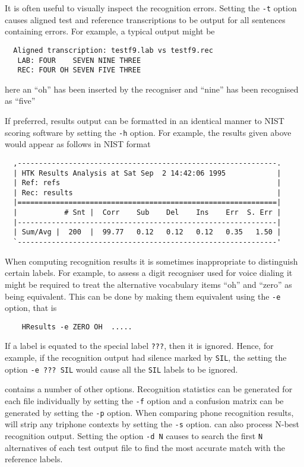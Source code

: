 It is often useful to visually inspect the 
recognition errors.  Setting the
\texttt{-t} option causes aligned test and reference transcriptions to
be output for all sentences containing errors.  For example, a typical
output might be
\begin{verbatim}
  Aligned transcription: testf9.lab vs testf9.rec
   LAB: FOUR    SEVEN NINE THREE
   REC: FOUR OH SEVEN FIVE THREE
\end{verbatim}
here an ``oh'' has been inserted by the recogniser and ``nine''
has been recognised as ``five''

If preferred, results output can be formatted in an identical
manner to NIST scoring software by setting the  {\tt -h} option.
For example, the results given above would appear as follows in
NIST format
\begin{verbatim}
  ,-------------------------------------------------------------.
  | HTK Results Analysis at Sat Sep  2 14:42:06 1995            |
  | Ref: refs                                                   |
  | Rec: results                                                |
  |=============================================================|
  |           # Snt |  Corr    Sub    Del    Ins    Err  S. Err |
  |-------------------------------------------------------------|
  | Sum/Avg |  200  |  99.77   0.12   0.12   0.12   0.35   1.50 |
  `-------------------------------------------------------------'
\end{verbatim}

When computing recognition results it is sometimes
inappropriate to distinguish certain labels.  For example, to assess
a digit recogniser used for voice dialing it might be required to
treat the alternative vocabulary items ``oh'' and ``zero'' as being
equivalent.  This can be done by making them equivalent using the
\texttt{-e} option, that is
\begin{verbatim}
    HResults -e ZERO OH  .....
\end{verbatim}
If a label is equated to the special label \verb+???+, then it 
is ignored.  Hence, for example, if the recognition output had
silence marked by \texttt{SIL}, the setting the option
\verb+-e ??? SIL+ would cause all the \texttt{SIL} labels to be
ignored.

 contains a number of other options.
Recognition statistics can be generated for each file
individually by setting the {\tt -f} option and a 
confusion matrix
can be generated by setting the  {\tt -p} option.
When comparing phone recognition results,  will
strip any triphone contexts by setting the  {\tt -s} option.
 can also process N-best recognition output.
Setting the option \texttt{-d N} causes  to
search the first \texttt{N} alternatives of each test output
file to find the most accurate match with the reference labels.

